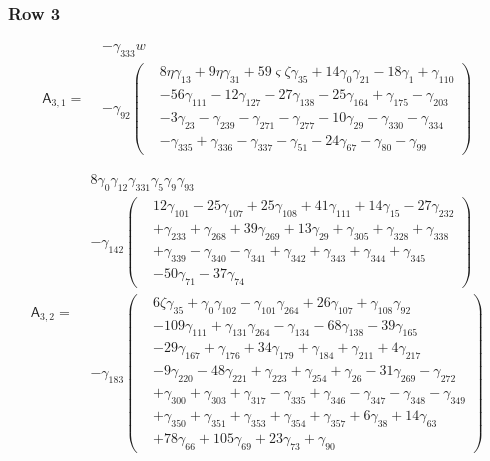 \subsubsection*{Row 3}
\[\mathsf A_{3,1}=\begin{aligned}&- \gamma_{333} w\\&- \gamma_{92} \left(\begin{aligned}& 8 \eta  \gamma_{13}+ 9 \eta  \gamma_{31}+ 59 \varsigma  \zeta  \gamma_{35}+ 14 \gamma_{0} \gamma_{21}- 18 \gamma_{1}+ \gamma_{110}\\&- 56 \gamma_{111}- 12 \gamma_{127}- 27 \gamma_{138}- 25 \gamma_{164}+ \gamma_{175}- \gamma_{203}\\&- 3 \gamma_{23}- \gamma_{239}- \gamma_{271}- \gamma_{277}- 10 \gamma_{29}- \gamma_{330}- \gamma_{334}\\&- \gamma_{335}+ \gamma_{336}- \gamma_{337}- \gamma_{51}- 24 \gamma_{67}- \gamma_{80}- \gamma_{99}\end{aligned}\right)\end{aligned}\]

\[\mathsf A_{3,2}=\begin{aligned}& 8 \gamma_{0} \gamma_{12} \gamma_{331} \gamma_{5} \gamma_{9} \gamma_{93}\\&- \gamma_{142} \left(\begin{aligned}& 12 \gamma_{101}- 25 \gamma_{107}+ 25 \gamma_{108}+ 41 \gamma_{111}+ 14 \gamma_{15}- 27 \gamma_{232}\\&+ \gamma_{233}+ \gamma_{268}+ 39 \gamma_{269}+ 13 \gamma_{29}+ \gamma_{305}+ \gamma_{328}+ \gamma_{338}\\&+ \gamma_{339}- \gamma_{340}- \gamma_{341}+ \gamma_{342}+ \gamma_{343}+ \gamma_{344}+ \gamma_{345}\\&- 50 \gamma_{71}- 37 \gamma_{74}\end{aligned}\right)\\&- \gamma_{183} \left(\begin{aligned}& 6 \zeta  \gamma_{35}+ \gamma_{0} \gamma_{102}- \gamma_{101} \gamma_{264}+ 26 \gamma_{107}+ \gamma_{108} \gamma_{92}\\&- 109 \gamma_{111}+ \gamma_{131} \gamma_{264}- \gamma_{134}- 68 \gamma_{138}- 39 \gamma_{165}\\&- 29 \gamma_{167}+ \gamma_{176}+ 34 \gamma_{179}+ \gamma_{184}+ \gamma_{211}+ 4 \gamma_{217}\\&- 9 \gamma_{220}- 48 \gamma_{221}+ \gamma_{223}+ \gamma_{254}+ \gamma_{26}- 31 \gamma_{269}- \gamma_{272}\\&+ \gamma_{300}+ \gamma_{303}+ \gamma_{317}- \gamma_{335}+ \gamma_{346}- \gamma_{347}- \gamma_{348}- \gamma_{349}\\&+ \gamma_{350}+ \gamma_{351}+ \gamma_{353}+ \gamma_{354}+ \gamma_{357}+ 6 \gamma_{38}+ 14 \gamma_{63}\\&+ 78 \gamma_{66}+ 105 \gamma_{69}+ 23 \gamma_{73}+ \gamma_{90}\end{aligned}\right)\end{aligned}\]

